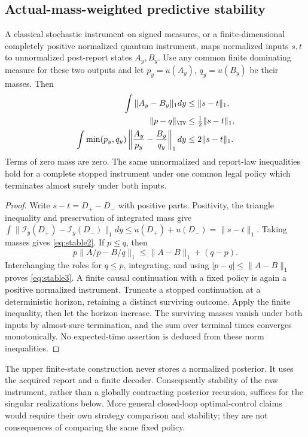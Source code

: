 \subsection*{Actual-mass-weighted predictive stability}
\begin{proposition}\label{prop:continuity}
A classical stochastic instrument on signed measures, or a finite-dimensional completely positive normalized quantum instrument, maps normalized inputs $s,t$ to unnormalized post-report states $A_y,B_y$. Use any common finite dominating measure for these two outputs and let $p_y=u(A_y)$, $q_y=u(B_y)$ be their masses. Then
\begin{align}
 \int\|A_y-B_y\|_1dy&\le\|s-t\|_1,\label{eq:stable1}\\
 \|p-q\|_{\TV}&\le\tfrac12\|s-t\|_1,\label{eq:stable2}\\
 \int\min(p_y,q_y)\left\|\frac{A_y}{p_y}-\frac{B_y}{q_y}\right\|_1dy
 &\le2\|s-t\|_1.\label{eq:stable3}
\end{align}
Terms of zero mass are zero. The same unnormalized and report-law inequalities hold for a complete stopped instrument under one common legal policy which terminates almost surely under both inputs.
\end{proposition}
\begin{proof}
Write $s-t=D_+-D_-$ with positive parts. Positivity, the triangle inequality and preservation of integrated mass give
$\int\|\mathcal I_y(D_+)-\mathcal I_y(D_-)\|_1dy\le u(D_+)+u(D_-)=\|s-t\|_1$.
Taking masses gives \eqref{eq:stable2}. If $p\le q$, then
\[
 p\|A/p-B/q\|_1\le\|A-B\|_1+(q-p).
\]
Interchanging the roles for $q\le p$, integrating, and using $|p-q|\le\|A-B\|_1$ proves \eqref{eq:stable3}. A finite causal continuation with a fixed policy is again a positive normalized instrument. Truncate a stopped continuation at a deterministic horizon, retaining a distinct surviving outcome. Apply the finite inequality, then let the horizon increase. The surviving masses vanish under both inputs by almost-sure termination, and the sum over terminal times converges monotonically. No expected-time assertion is deduced from these norm inequalities.
\end{proof}

The upper finite-state construction never stores a normalized posterior. It uses the acquired report and a finite decoder. Consequently stability of the raw instrument, rather than a globally contracting posterior recursion, suffices for the singular realizations below. More general closed-loop optimal-control claims would require their own strategy comparison and stability; they are not consequences of comparing the same fixed policy.
